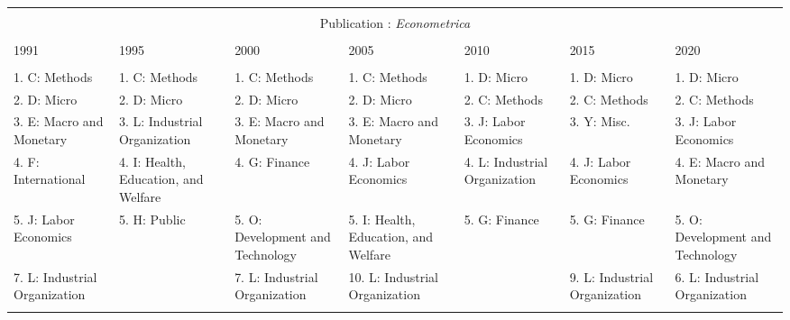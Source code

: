 
\begin{table}[h] \centering 
  \caption{} 
  \label{} 
\begin{adjustbox}{max width = \textwidth}
\scriptsize 
\begin{tabular}{@{\extracolsep{5pt}} lllllll} 
\\[-1.8ex]\hline 
\hline \\[-1.8ex] \multicolumn{7}{c}{Publication : \textit{Econometrica}} \\
 \cline{1-7} \\
1991 & 1995 & 2000 & 2005 & 2010 & 2015 & 2020 \\ 
\hline \\[-1.8ex] 
1. C: Methods & 1. C: Methods & 1. C: Methods & 1. C: Methods & 1. D: Micro & 1. D: Micro & 1. D: Micro \\ 
2. D: Micro & 2. D: Micro & 2. D: Micro & 2. D: Micro & 2. C: Methods & 2. C: Methods & 2. C: Methods \\ 
3. E: Macro and Monetary & 3. L: Industrial Organization & 3. E: Macro and Monetary & 3. E: Macro and Monetary & 3. J: Labor Economics & 3. Y: Misc. & 3. J: Labor Economics \\ 
4. F: International & 4. I: Health, Education, and Welfare & 4. G: Finance & 4. J: Labor Economics & 4. L: Industrial Organization & 4. J: Labor Economics & 4. E: Macro and Monetary \\ 
5. J: Labor Economics & 5. H: Public & 5. O: Development and Technology & 5. I: Health, Education, and Welfare & 5. G: Finance & 5. G: Finance & 5. O: Development and Technology \\ 
7. L: Industrial Organization &  & 7. L: Industrial Organization & 10. L: Industrial Organization &  & 9. L: Industrial Organization & 6. L: Industrial Organization \\ 
\hline \\[-1.8ex] 
\end{tabular} 
\end{adjustbox} 
\end{table} 
